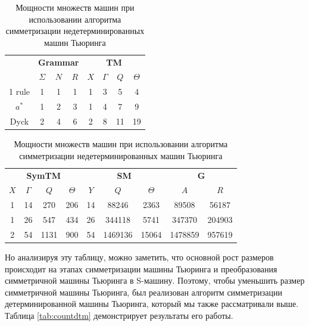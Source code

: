 \documentclass[14pt]{matmex-diploma-custom}
\begin{document}
\begin{table}[H]
\centering
\begin{tabular}{|c|
c|c|c|
c|c|c|c|}
\hline
&
\multicolumn{3}{|c|}{\textbf{Grammar}}&
\multicolumn{4}{|c|}{\textbf{TM}}\\
\cline{2-8}
&$\Sigma$&$N$&$R$
&$X$&$\Gamma$&$Q$&$\Theta$\\
\hline
1 rule
&1&1&1
&1&3&5&4\\
\hline
$a^*$
&1&2&3
&1&4&7&9\\
\hline
Dyck
&2&4&6
&2&8&11&19\\
\hline
\end{tabular}
\begin{tabular}{
|c|c|c|c|
c|c|c|
c|c|}
\hline
\multicolumn{4}{|c|}{\textbf{SymTM}}&
\multicolumn{3}{|c|}{\textbf{SM}}&
\multicolumn{2}{|c|}{\textbf{G}}\\
\cline{1-9}
$X$&$\Gamma$&$Q$&$\Theta$
&$Y$&$Q$&$\Theta$
&$A$&$R$\\
\hline
1&14&270&206
&14&88246&2363
&89508&56187\\
\hline
1&26&547&434
&26&344118&5741
&347370&204903\\
\hline
2&54&1131&900
&54&1469136&15064
&1478859&957619\\
\hline
\end{tabular}
\caption{Мощности множеств машин при использовании алгоритма симметризации недетерминированных машин Тьюринга}
\label{tab:countndtm}
\end{table}


Но анализируя эту таблицу, можно заметить, что основной рост размеров происходит на этапах симметризации машины Тьюринга и преобразования симметричной машины Тьюринга в S-машину. Поэтому, чтобы уменьшить размер симметричной машины Тьюринга, был реализован алгоритм симметризации детерминированной машины Тьюринга, который мы также рассматривали выше. Таблица \ref{tab:countdtm} демонстрирует результаты его работы. 
\end{document}
